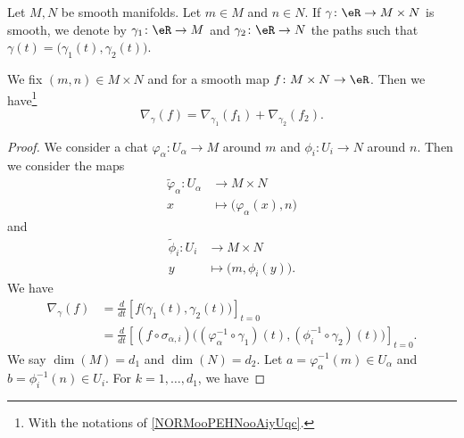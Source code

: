 \begin{proposition}	\label{PROPooAKWIooGxTwnQ}
	Let \( M,N\) be smooth manifolds. Let \( m\in M\) and \( n\in N\). If \(\gamma \colon \eR\to M\times N  \) is smooth, we denote by \(\gamma_1 \colon \eR\to M  \) and \(\gamma_2 \colon \eR\to N  \) the paths such that \( \gamma(t)=\big( \gamma_1(t),\gamma_2(t) \big)\).

	We fix \( (m,n)\in M\times N\) and for a smooth map \(f \colon M\times N\to \eR  \). Then we have\footnote{With the notations of \ref{NORMooPEHNooAiyUqc}.}
	\begin{equation}
		\nabla_{\gamma}(f)=\nabla_{\gamma_1}(f_1)+\nabla_{\gamma_2}(f_2).
	\end{equation}
\end{proposition}

\begin{proof}
	We consider a chat \(\varphi_{\alpha} \colon U_{\alpha}\to M  \) around \( m\) and \(\phi_i \colon U_i\to N  \) around \( n\). Then we consider the maps
	\begin{equation}
		\begin{aligned}
			\tilde \varphi_{\alpha}\colon U_{\alpha} & \to M\times N                              \\
			x                                        & \mapsto \big( \varphi_{\alpha}(x), n \big)
		\end{aligned}
	\end{equation}
	and
	\begin{equation}
		\begin{aligned}
			\tilde \phi_i\colon U_i & \to M\times N                    \\
			y                       & \mapsto \big( m,\phi_i(y) \big).
		\end{aligned}
	\end{equation}
	We have
	\begin{subequations}		\label{SUBEQSooXRISooUJIdlF}
		\begin{align}
			\nabla_{\gamma}(f) & =\frac{d}{dt} \left[ f\Big( \gamma_1(t),\gamma_2(t) \Big)  \right]_{t=0}                                                                        \\
			                   & =\frac{d}{dt} \left[ (f\circ\sigma_{\alpha,i})\Big( (\varphi_{\alpha}^{-1}\circ\gamma_1)(t),(\phi_i^{-1}\circ\gamma_2)(t) \Big)  \right]_{t=0}.
		\end{align}
	\end{subequations}
	We say \( \dim(M)=d_1\) and \( \dim(N)=d_2\). Let \( a=\varphi_{\alpha}^{-1}(m)\in U_{\alpha}\) and \( b=\phi_i^{-1}(n)\in U_i\). For \( k=1,\ldots,d_1\), we have

\end{proof}
